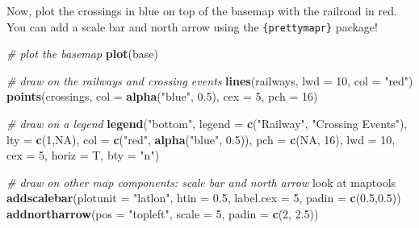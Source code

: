 \documentclass[]{book}
\newenvironment{Shaded}{\begin{snugshade}}{\end{snugshade}}
\newcommand{\KeywordTok}[1]{\textcolor[rgb]{0.13,0.29,0.53}{\textbf{#1}}}
\newcommand{\DataTypeTok}[1]{\textcolor[rgb]{0.13,0.29,0.53}{#1}}
\newcommand{\DecValTok}[1]{\textcolor[rgb]{0.00,0.00,0.81}{#1}}
\newcommand{\FloatTok}[1]{\textcolor[rgb]{0.00,0.00,0.81}{#1}}
\newcommand{\StringTok}[1]{\textcolor[rgb]{0.31,0.60,0.02}{#1}}
\newcommand{\CommentTok}[1]{\textcolor[rgb]{0.56,0.35,0.01}{\textit{#1}}}
\newcommand{\OtherTok}[1]{\textcolor[rgb]{0.56,0.35,0.01}{#1}}
\newcommand{\NormalTok}[1]{#1}
\theoremstyle{definition}
\theoremstyle{definition}
\theoremstyle{definition}
\theoremstyle{remark}
\begin{document}
Now, plot the crossings in blue on top of the basemap with the railroad
in red. You can add a scale bar and north arrow using the
\texttt{\{prettymapr\}} \citep{R-prettymapr} package!

\begin{Shaded}
\begin{Highlighting}[]
\CommentTok{# plot the basemap}
\KeywordTok{plot}\NormalTok{(base)}

\CommentTok{# draw on the railways and crossing events}
\KeywordTok{lines}\NormalTok{(railways, }\DataTypeTok{lwd =} \DecValTok{10}\NormalTok{, }\DataTypeTok{col =} \StringTok{"red"}\NormalTok{)}
\KeywordTok{points}\NormalTok{(crossings, }\DataTypeTok{col =} \KeywordTok{alpha}\NormalTok{(}\StringTok{"blue"}\NormalTok{, }\FloatTok{0.5}\NormalTok{), }\DataTypeTok{cex =} \DecValTok{5}\NormalTok{, }\DataTypeTok{pch =} \DecValTok{16}\NormalTok{)}

\CommentTok{# draw on a legend}
\KeywordTok{legend}\NormalTok{(}\StringTok{"bottom"}\NormalTok{, }\DataTypeTok{legend =} \KeywordTok{c}\NormalTok{(}\StringTok{"Railway"}\NormalTok{, }\StringTok{"Crossing Events"}\NormalTok{),}
       \DataTypeTok{lty =} \KeywordTok{c}\NormalTok{(}\DecValTok{1}\NormalTok{,}\OtherTok{NA}\NormalTok{), }\DataTypeTok{col =} \KeywordTok{c}\NormalTok{(}\StringTok{"red"}\NormalTok{, }\KeywordTok{alpha}\NormalTok{(}\StringTok{"blue"}\NormalTok{, }\FloatTok{0.5}\NormalTok{)),}
       \DataTypeTok{pch =} \KeywordTok{c}\NormalTok{(}\OtherTok{NA}\NormalTok{, }\DecValTok{16}\NormalTok{), }\DataTypeTok{lwd =} \DecValTok{10}\NormalTok{, }\DataTypeTok{cex =} \DecValTok{5}\NormalTok{, }\DataTypeTok{horiz =}\NormalTok{ T, }\DataTypeTok{bty =} \StringTok{"n"}\NormalTok{)}

\CommentTok{# draw on other map components: scale bar and north arrow}
\NormalTok{look at maptools}
\KeywordTok{addscalebar}\NormalTok{(}\DataTypeTok{plotunit =} \StringTok{"latlon"}\NormalTok{, }\DataTypeTok{htin =} \FloatTok{0.5}\NormalTok{,}
            \DataTypeTok{label.cex =} \DecValTok{5}\NormalTok{, }\DataTypeTok{padin =} \KeywordTok{c}\NormalTok{(}\FloatTok{0.5}\NormalTok{,}\FloatTok{0.5}\NormalTok{))}
\KeywordTok{addnortharrow}\NormalTok{(}\DataTypeTok{pos =} \StringTok{"topleft"}\NormalTok{, }\DataTypeTok{scale =} \DecValTok{5}\NormalTok{, }\DataTypeTok{padin =} \KeywordTok{c}\NormalTok{(}\DecValTok{2}\NormalTok{, }\FloatTok{2.5}\NormalTok{))}
\end{Highlighting}
\end{Shaded}
\end{document}
